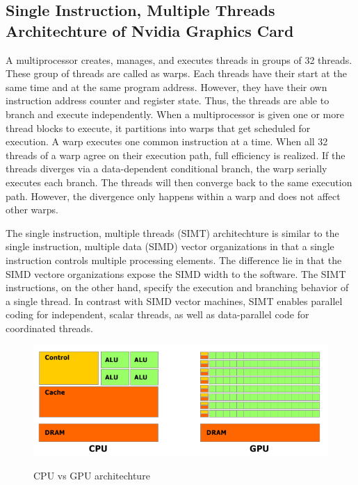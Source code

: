 \subsection{Single Instruction, Multiple Threads Architechture of Nvidia Graphics Card}
A multiprocessor creates, manages, and executes threads in groups of 32 threads\cite{NVCudaPrgGuide}. 
These group of threads are called as warps. Each threads have their start at the same 
time and at the same program address. However, they have their own instruction address 
counter and register state. Thus, the threads are able to branch and execute independently.
When a multiprocessor is given one or more thread blocks to execute, it partitions into warps 
that get scheduled for execution. A warp executes one common instruction at a time. When
all 32 threads of a warp agree on their execution path, full efficiency is realized. If the threads
diverges via a data-dependent conditional branch, the warp serially executes each branch.
The threads will then converge back to the same execution path.  However, the divergence only
happens within a warp and does not affect other warps.

The single instruction, multiple threads (SIMT) architechture is similar to the single instruction,
multiple data (SIMD) vector organizations in that a single instruction controls multiple processing
elements\cite{NVCudaPrgGuide}. The difference lie in that the SIMD vectore organizations expose 
the SIMD width to the software. The SIMT instructions, on the other hand, specify the execution 
and branching behavior of a single thread. In contrast with SIMD vector machines, SIMT 
enables parallel coding for independent, scalar threads, as well as data-parallel code for 
coordinated threads. 

\begin{figure}
	\centering
		\graphicspath{{images/}}
		\includegraphics[width=190 pt]{cpu_gpu_blackandwhite.png}
	\caption{CPU vs GPU architechture}
	\cite{pdf:NVCudaPrgGuide}
	\label{fig:gpu_diagram}
\end{figure}


